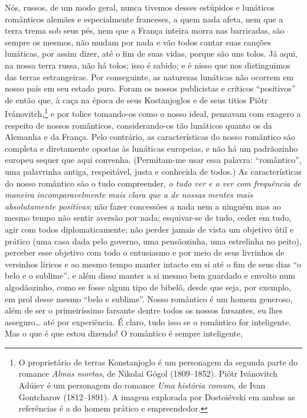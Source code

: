 Nós, russos, de um modo geral, nunca tivemos desses estúpidos e lunáticos
românticos alemães e especialmente franceses, a quem nada afeta, nem que a
terra trema sob seus pés, nem que a França inteira morra nas barricadas, são
sempre os mesmos, não mudam por nada e vão todos cantar suas canções lunáticas,
por assim dizer, até o fim de suas vidas, porque são uns tolos. Já aqui, na
nossa terra russa, não há tolos; isso é sabido; e é nisso que nos distinguimos
das terras estrangeiras. Por conseguinte, as naturezas lunáticas não ocorrem em
nosso país em seu estado puro. Foram os nossos publicistas e críticos
“positivos” de então que, à caça na época de seus Kostanjoglos e de seus titios
Piôtr Ivánovitch,\footnote{ O proprietário de terras Konstanjoglo é um
personagem da segunda parte do romance \textit{Almas mortas}, de Nikolai Gógol
(1809--1852).  Piôtr Ivánovitch Adúiev é um personagem do romance \textit{Uma
história comum}, de Ivan Gontcharov (1812--1891). A imagem explorada por
Dostoiévski em ambas as referências é a do homem prático e empreendedor.} e por
tolice tomando-os como o nosso ideal, pensavam com exagero a respeito de nossos
românticos, considerando-os tão lunáticos quanto os da Alemanha e da França.
Pelo contrário, as características do nosso romântico são completa e
diretamente opostas às lunáticas europeias, e não há um padrãozinho europeu
sequer que aqui convenha. (Permitam-me usar essa palavra: “romântico”, uma
palavrinha antiga, respeitável, justa e conhecida de todos.) As características
do nosso romântico são o tudo compreender, \textit{o tudo ver e o ver com
frequência de maneira incomparavelmente mais clara que a de nossas mentes mais
absolutamente positivas}; não fazer concessões a nada nem a ninguém mas ao
mesmo tempo não sentir aversão por nada; esquivar-se de tudo, ceder em tudo,
agir com todos diplomaticamente; não perder jamais de vista um objetivo útil e
prático (uma casa dada pelo governo, uma pensãozinha, uma estrelinha no peito),
perceber esse objetivo com todo o entusiasmo e por meio de seus livrinhos de
versinhos líricos e ao mesmo tempo manter intacto em si até o fim de seus dias
“o belo e o sublime”, e além disso manter a si mesmo bem guardado e envolto num
algodãozinho, como se fosse algum tipo de bibelô, desde que seja, por exemplo,
em prol desse mesmo “belo e sublime”. Nosso romântico é um homem generoso, além
de ser o primeiríssimo farsante dentre todos os nossos farsantes, eu lhes
asseguro\ldots{} até por experiência. É claro, tudo isso se o romântico for
inteligente. Mas o que é que estou dizendo! O romântico é sempre inteligente,
